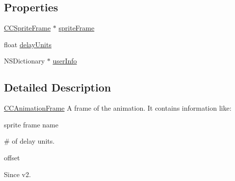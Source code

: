 \subsection*{Properties}
\begin{DoxyCompactItemize}
\item 
\hyperlink{interface_c_c_sprite_frame}{C\-C\-Sprite\-Frame} $\ast$ \hyperlink{interface_c_c_animation_frame_a42391105614626578802667da59120fc}{sprite\-Frame}
\item 
float \hyperlink{interface_c_c_animation_frame_aa03ce459c21bb02117a0136d13f5b7ff}{delay\-Units}
\item 
N\-S\-Dictionary $\ast$ \hyperlink{interface_c_c_animation_frame_a9eb75cd1e56aafd7d4041ca0a50598b4}{user\-Info}
\end{DoxyCompactItemize}


\subsection{Detailed Description}
\hyperlink{interface_c_c_animation_frame}{C\-C\-Animation\-Frame} A frame of the animation. It contains information like\-:
\begin{DoxyItemize}
\item sprite frame name
\item \# of delay units.
\item offset
\end{DoxyItemize}

\begin{DoxySince}{Since}
v2. 
\end{DoxySince}


